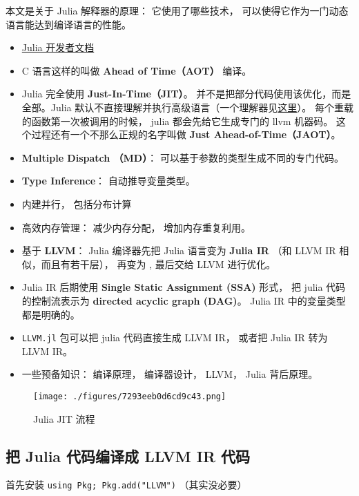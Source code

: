 
\begin{issues}
\issueDraft
\end{issues}

本文是关于 Julia 解释器的原理： 它使用了哪些技术， 可以使得它作为一门动态语言能达到编译语言的性能。

\begin{itemize}
\item \href{https://docs.julialang.org/en/v1/devdocs/init/}{Julia 开发者文档}
\item C 语言这样的叫做 \textbf{Ahead of Time（AOT）} 编译。
\item Julia 完全使用 \textbf{Just-In-Time（JIT）}。 并不是把部分代码使用该优化，而是全部。Julia 默认不直接理解并执行高级语言（一个理解器见\href{https://juliadebug.github.io/JuliaInterpreter.jl/stable/}{这里}）。 每个重载的函数第一次被调用的时候， julia 都会先给它生成专门的 llvm 机器码。 这个过程还有一个不那么正规的名字叫做 \textbf{Just Ahead-of-Time（JAOT）}。
\item \textbf{Multiple Dispatch （MD）}： 可以基于参数的类型生成不同的专门代码。
\item \textbf{Type Inference}： 自动推导变量类型。
\item 内建并行， 包括分布计算
\item 高效内存管理： 减少内存分配， 增加内存重复利用。
\item 基于 \textbf{LLVM}： Julia 编译器先把 Julia 语言变为 \textbf{Julia IR} （和 LLVM IR 相似，而且有若干层）， 再变为 , 最后交给 LLVM 进行优化。
\item Julia IR 后期使用 \textbf{Single Static Assignment (SSA)} 形式， 把 julia 代码的控制流表示为 \textbf{directed acyclic graph (DAG)}。 Julia IR 中的变量类型都是明确的。
\item \verb`LLVM.jl` 包可以把 julia 代码直接生成 LLVM IR， 或者把 Julia IR 转为 LLVM IR。
\item 一些预备知识： 编译原理， 编译器设计， LLVM， Julia 背后原理。
\end{itemize}

\begin{figure}[ht]
\centering
\texttt{[image: ./figures/7293eeb0d6cd9c43.png]}
\caption{Julia JIT 流程} \label{fig_julia0_1}
\end{figure}

\subsection{把 Julia 代码编译成 LLVM IR 代码}
首先安装 \verb`using Pkg; Pkg.add("LLVM")` （其实没必要）

